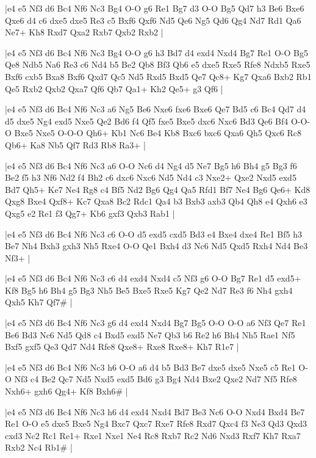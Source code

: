 \whitename{}
\blackname{}
\makegametitle
|e4 e5 Nf3 d6 Bc4 Nf6 Nc3 Bg4 O-O g6 Re1 Bg7 d3 O-O Bg5 Qd7 h3 Be6 Bxe6 Qxe6 d4 c6 dxe5 dxe5 Re3 c5 Bxf6 Qxf6 Nd5 Qe6 Ng5 Qd6 Qg4 Nd7 Rd1 Qa6 Ne7+ Kh8 Rxd7 Qxa2 Rxb7 Qxb2 Rxb2  |

\whitename{}
\blackname{}
\makegametitle
|e4 e5 Nf3 d6 Bc4 Nf6 Nc3 Bg4 O-O g6 h3 Bd7 d4 exd4 Nxd4 Bg7 Re1 O-O Bg5 Qe8 Ndb5 Na6 Re3 c6 Nd4 b5 Be2 Qb8 Bf3 Qb6 e5 dxe5 Rxe5 Rfe8 Ndxb5 Rxe5 Bxf6 cxb5 Bxa8 Bxf6 Qxd7 Qc5 Nd5 Rxd5 Bxd5 Qe7 Qc8+ Kg7 Qxa6 Bxb2 Rb1 Qe5 Rxb2 Qxb2 Qxa7 Qf6 Qb7 Qa1+ Kh2 Qe5+ g3 Qf6  |

\whitename{}
\blackname{}
\makegametitle
|e4 e5 Nf3 d6 Bc4 Nf6 Nc3 a6 Ng5 Be6 Nxe6 fxe6 Bxe6 Qe7 Bd5 c6 Bc4 Qd7 d4 d5 dxe5 Ng4 exd5 Nxe5 Qe2 Bd6 f4 Qf5 fxe5 Bxe5 dxc6 Nxc6 Bd3 Qe6 Bf4 O-O-O Bxe5 Nxe5 O-O-O Qh6+ Kb1 Nc6 Be4 Kb8 Bxc6 bxc6 Qxa6 Qh5 Qxc6 Rc8 Qb6+ Ka8 Nb5 Qf7 Rd3 Rb8 Ra3+  |

\whitename{}
\blackname{}
\makegametitle
|e4 e5 Nf3 d6 Bc4 Nf6 Nc3 a6 O-O Nc6 d4 Ng4 d5 Ne7 Bg5 h6 Bh4 g5 Bg3 f6 Be2 f5 h3 Nf6 Nd2 f4 Bh2 c6 dxc6 Nxc6 Nd5 Nd4 c3 Nxe2+ Qxe2 Nxd5 exd5 Bd7 Qh5+ Ke7 Ne4 Rg8 c4 Bf5 Nd2 Bg6 Qg4 Qa5 Rfd1 Bf7 Ne4 Bg6 Qe6+ Kd8 Qxg8 Bxe4 Qxf8+ Kc7 Qxa8 Bc2 Rdc1 Qa4 b3 Bxb3 axb3 Qb4 Qh8 e4 Qxh6 e3 Qxg5 e2 Re1 f3 Qg7+ Kb6 gxf3 Qxb3 Rab1  |

\whitename{}
\blackname{}
\makegametitle
|e4 e5 Nf3 d6 Bc4 Nf6 Nc3 c6 O-O d5 exd5 cxd5 Bd3 e4 Bxe4 dxe4 Re1 Bf5 h3 Be7 Nh4 Bxh3 gxh3 Nh5 Rxe4 O-O Qe1 Bxh4 d3 Nc6 Nd5 Qxd5 Rxh4 Nd4 Be3 Nf3+  |

\whitename{}
\blackname{}
\makegametitle
|e4 e5 Nf3 d6 Bc4 Nf6 Nc3 c6 d4 exd4 Nxd4 c5 Nf3 g6 O-O Bg7 Re1 d5 exd5+ Kf8 Bg5 h6 Bh4 g5 Bg3 Nh5 Be5 Bxe5 Rxe5 Kg7 Qe2 Nd7 Re3 f6 Nh4 gxh4 Qxh5 Kh7 Qf7\#  |

\whitename{}
\blackname{}
\makegametitle
|e4 e5 Nf3 d6 Bc4 Nf6 Nc3 g6 d4 exd4 Nxd4 Bg7 Bg5 O-O O-O a6 Nf3 Qe7 Re1 Be6 Bd3 Nc6 Nd5 Qd8 c4 Bxd5 exd5 Ne7 Qb3 b6 Re2 h6 Bh4 Nh5 Rae1 Nf5 Bxf5 gxf5 Qe3 Qd7 Nd4 Rfe8 Qxe8+ Rxe8 Rxe8+ Kh7 R1e7  |

\whitename{}
\blackname{}
\makegametitle
|e4 e5 Nf3 d6 Bc4 Nf6 Nc3 h6 O-O a6 d4 b5 Bd3 Be7 dxe5 dxe5 Nxe5 c5 Re1 O-O Nf3 c4 Be2 Qc7 Nd5 Nxd5 exd5 Bd6 g3 Bg4 Nd4 Bxe2 Qxe2 Nd7 Nf5 Rfe8 Nxh6+ gxh6 Qg4+ Kf8 Bxh6\#  |

\whitename{}
\blackname{}
\makegametitle
|e4 e5 Nf3 d6 Bc4 Nf6 Nc3 h6 d4 exd4 Nxd4 Bd7 Be3 Nc6 O-O Nxd4 Bxd4 Be7 Re1 O-O e5 dxe5 Bxe5 Ng4 Bxc7 Qxc7 Rxe7 Rfe8 Rxd7 Qxc4 f3 Ne3 Qd3 Qxd3 cxd3 Nc2 Rc1 Re1+ Rxe1 Nxe1 Ne4 Rc8 Rxb7 Rc2 Nd6 Nxd3 Rxf7 Kh7 Rxa7 Rxb2 Nc4 Rb1\#  |

